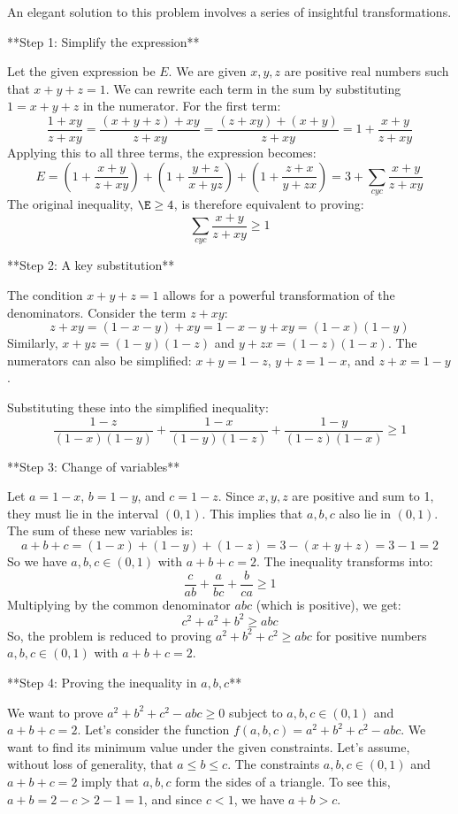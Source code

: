 An elegant solution to this problem involves a series of insightful transformations.

**Step 1: Simplify the expression**

Let the given expression be $E$. We are given $x, y, z$ are positive real numbers such that $x+y+z=1$.
We can rewrite each term in the sum by substituting $1=x+y+z$ in the numerator.
For the first term:
$$ \frac{1+xy}{z+xy} = \frac{(x+y+z)+xy}{z+xy} = \frac{(z+xy) + (x+y)}{z+xy} = 1 + \frac{x+y}{z+xy} $$
Applying this to all three terms, the expression becomes:
$$ E = \left(1 + \frac{x+y}{z+xy}\right) + \left(1 + \frac{y+z}{x+yz}\right) + \left(1 + \frac{z+x}{y+zx}\right) = 3 + \sum_{cyc} \frac{x+y}{z+xy} $$
The original inequality, $\E \ge 4$, is therefore equivalent to proving:
$$ \sum_{cyc} \frac{x+y}{z+xy} \ge 1 $$

**Step 2: A key substitution**

The condition $x+y+z=1$ allows for a powerful transformation of the denominators. Consider the term $z+xy$:
$$ z+xy = (1-x-y) + xy = 1-x-y+xy = (1-x)(1-y) $$
Similarly, $x+yz = (1-y)(1-z)$ and $y+zx = (1-z)(1-x)$.
The numerators can also be simplified: $x+y = 1-z$, $y+z=1-x$, and $z+x=1-y$.

Substituting these into the simplified inequality:
$$ \frac{1-z}{(1-x)(1-y)} + \frac{1-x}{(1-y)(1-z)} + \frac{1-y}{(1-z)(1-x)} \ge 1 $$

**Step 3: Change of variables**

Let $a = 1-x$, $b = 1-y$, and $c = 1-z$.
Since $x,y,z$ are positive and sum to 1, they must lie in the interval $(0,1)$. This implies that $a,b,c$ also lie in $(0,1)$.
The sum of these new variables is:
$$ a+b+c = (1-x)+(1-y)+(1-z) = 3 - (x+y+z) = 3-1 = 2 $$
So we have $a,b,c \in (0,1)$ with $a+b+c=2$.
The inequality transforms into:
$$ \frac{c}{ab} + \frac{a}{bc} + \frac{b}{ca} \ge 1 $$
Multiplying by the common denominator $abc$ (which is positive), we get:
$$ c^2+a^2+b^2 \ge abc $$
So, the problem is reduced to proving $a^2+b^2+c^2 \ge abc$ for positive numbers $a,b,c \in (0,1)$ with $a+b+c=2$.

**Step 4: Proving the inequality in $a,b,c$**

We want to prove $a^2+b^2+c^2 - abc \ge 0$ subject to $a,b,c \in (0,1)$ and $a+b+c=2$.
Let's consider the function $f(a,b,c) = a^2+b^2+c^2 - abc$. We want to find its minimum value under the given constraints.
Let's assume, without loss of generality, that $a \le b \le c$. The constraints $a,b,c \in (0,1)$ and $a+b+c=2$ imply that $a,b,c$ form the sides of a triangle. To see this, $a+b = 2-c > 2-1=1$, and since $c<1$, we have $a+b > c$.

